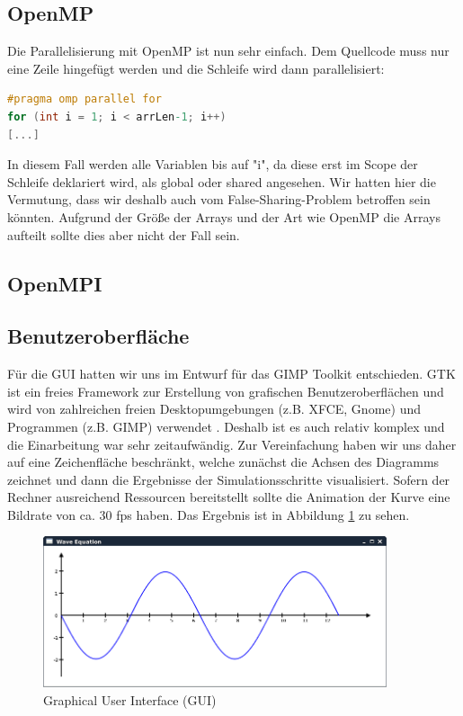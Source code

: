 \subsection{OpenMP}
Die Parallelisierung mit OpenMP ist nun sehr einfach. Dem Quellcode muss nur eine Zeile hingefügt werden und die Schleife wird dann parallelisiert:

\begin{lstlisting}[language=C]
#pragma omp parallel for
for (int i = 1; i < arrLen-1; i++)
[...]
\end{lstlisting}

In diesem Fall werden alle Variablen bis auf "i", da diese erst im Scope der Schleife deklariert wird, als global oder shared angesehen. Wir hatten hier die Vermutung, dass wir deshalb auch vom False-Sharing-Problem betroffen sein könnten. Aufgrund der Größe der Arrays und der Art wie OpenMP die Arrays aufteilt sollte dies aber nicht der Fall sein.

\subsection{OpenMPI}


\subsection{Benutzeroberfläche}
Für die GUI hatten wir uns im Entwurf für das GIMP Toolkit entschieden. GTK ist ein freies Framework zur Erstellung von grafischen Benutzeroberflächen und wird von zahlreichen freien Desktopumgebungen (z.B. XFCE, Gnome) und Programmen (z.B. GIMP) verwendet \cite{GTKMain}\cite{GTKSuccess}. Deshalb ist es auch relativ komplex und die Einarbeitung war sehr zeitaufwändig. Zur Vereinfachung haben wir uns daher auf eine Zeichenfläche beschränkt, welche zunächst die Achsen des Diagramms zeichnet und dann die Ergebnisse der Simulationsschritte visualisiert. Sofern der Rechner ausreichend Ressourcen bereitstellt sollte die Animation der Kurve eine Bildrate von ca. 30 fps haben. Das Ergebnis ist in Abbildung \ref{fig:gui} zu sehen.

\begin{figure}[H]
	\centering
	\includegraphics[width=0.9\textwidth]{pictures/gui}
	\caption{Graphical User Interface (GUI)}
	\label{fig:gui}
\end{figure}